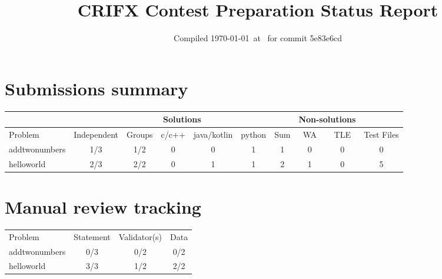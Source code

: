 \documentclass{article}%
\title{CRIFX Contest Preparation Status Report}%
\date{Compiled \today~at \DTMcurrenttime\DTMcurrentzone~for commit 5e83e6cd}%
\begin{document}
%
\normalsize%
\maketitle%
\section{Submissions summary}%
\label{sec:Submissionssummary}%
\begin{tabular}{|l|c|c|c|c|c|c|c|c|c|}%
\hline%
\rowcolor{cyan}%
&\multicolumn{6}{c}{{\tiny Solutions}}&\multicolumn{2}{|c|}{{\tiny Non-solutions}}&\\%
\hline%
\rowcolor{cyan}%
{\tiny Problem}&{\tiny Independent}&{\tiny Groups}&{\tiny c/c++}&{\tiny java/kotlin}&{\tiny python}&{\tiny Sum}&{\tiny WA}&{\tiny TLE}&{\tiny Test Files}\\%
\hline%
addtwonumbers&\cellcolor{red}1/3&\cellcolor{red}1/2&0&0&1&1&0&0&0\\%
\hline%
helloworld&\cellcolor{red}2/3&\cellcolor{green}2/2&0&1&1&2&1&0&5\\%
\hline%
\end{tabular}

%
\section{Manual review tracking}%
\label{sec:Manualreviewtracking}%
\begin{tabular}{|l|c|c|c|}%
\hline%
\rowcolor{cyan}%
{\tiny Problem}&{\tiny Statement}&{\tiny Validator(s)}&{\tiny Data}\\%
addtwonumbers&\cellcolor{red}0/3&\cellcolor{red}0/2&\cellcolor{red}0/2\\%
\hline%
helloworld&\cellcolor{green}3/3&\cellcolor{red}1/2&\cellcolor{green}2/2\\%
\hline%
\end{tabular}

%
\end{document}
